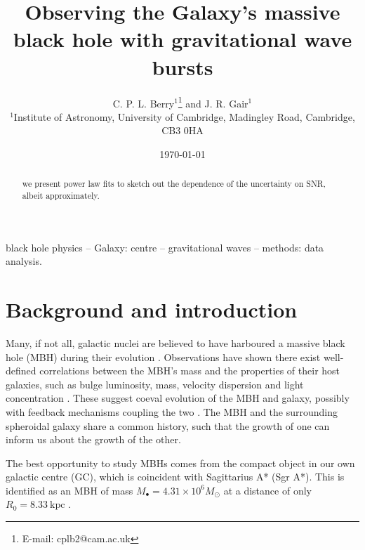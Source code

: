\documentclass[useAMS,usedcolumn,usegraphicx,usenatbib]{mn2e}
\title[Observing the Galaxy's MBH with GW bursts]{Observing the Galaxy's massive black hole with gravitational wave bursts}
\author[C. P. L. Berry and J. R. Gair]{C. P. L. Berry$^{1}$\thanks{E-mail:
cplb2@cam.ac.uk}  and J. R. Gair$^{1}$\\
$^{1}$Institute of Astronomy, University of Cambridge, Madingley Road, Cambridge, CB3 0HA}
\newcommand{\units}[1]{\ensuremath{~\mathrm{#1}}}
\begin{document}
\date{\today}

\pagerange{\pageref{firstpage}--\pageref{lastpage}} 

\maketitle

\label{firstpage}

\begin{abstract}
we present power law fits to sketch out the dependence of the uncertainty on SNR, albeit approximately.
\end{abstract}

\begin{keywords}
black hole physics -- Galaxy: centre -- gravitational waves -- methods: data analysis.
\end{keywords}

\section{Background and introduction}\label{sec:Intro}

Many, if not all, galactic nuclei are believed to have harboured a massive black hole (MBH) during their evolution \citep{Lynden-Bell1971, Soltan1982, Rees1984}. Observations have shown there exist well-defined correlations between the MBH's mass and the properties of their host galaxies, such as bulge luminosity, mass, velocity dispersion and light concentration \citep{Kormendy1995, Magorrian1998, Ferrarese2000, Gebhardt2000, Graham2001, Tremaine2002, Marconi2003, Haring2004, Graham2007, Graham2011}. These suggest coeval evolution of the MBH and galaxy, possibly with feedback mechanisms coupling the two \citep{Haiman2004, Volonteri2009}. The MBH and the surrounding spheroidal galaxy share a common history, such that the growth of one can inform us about the growth of the other.


The best opportunity to study MBHs comes from the compact object in our own galactic centre (GC), which is coincident with Sagittarius A* (Sgr A*). This is identified as an MBH of mass $M_\bullet = 4.31 \times 10^6 M_\odot$ at a distance of only $R_0 = 8.33\units{kpc}$ \citep{Gillessen2009}.
\end{document}
